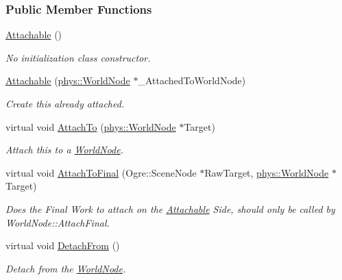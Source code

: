 \subsubsection*{Public Member Functions}
\begin{DoxyCompactItemize}
\item 
\hyperlink{classphys_1_1Attachable_a93c18f22769a1f70ae300fc2c58210eb}{Attachable} ()
\begin{DoxyCompactList}\small\item\em No initialization class constructor. \item\end{DoxyCompactList}\item 
\hyperlink{classphys_1_1Attachable_adec6826c5d9fada8b86d587d7d85a1ef}{Attachable} (\hyperlink{classphys_1_1WorldNode}{phys::WorldNode} $\ast$\_\-AttachedToWorldNode)
\begin{DoxyCompactList}\small\item\em Create this already attached. \item\end{DoxyCompactList}\item 
virtual void \hyperlink{classphys_1_1Attachable_aeec2532772cddde03d3894d99e637367}{AttachTo} (\hyperlink{classphys_1_1WorldNode}{phys::WorldNode} $\ast$Target)
\begin{DoxyCompactList}\small\item\em Attach this to a \hyperlink{classphys_1_1WorldNode}{WorldNode}. \item\end{DoxyCompactList}\item 
virtual void \hyperlink{classphys_1_1Attachable_a77c8234874f53b159f4156c0c984fad0}{AttachToFinal} (Ogre::SceneNode $\ast$RawTarget, \hyperlink{classphys_1_1WorldNode}{phys::WorldNode} $\ast$Target)
\begin{DoxyCompactList}\small\item\em Does the Final Work to attach on the \hyperlink{classphys_1_1Attachable}{Attachable} Side, should only be called by WorldNode::AttachFinal. \item\end{DoxyCompactList}\item 
virtual void \hyperlink{classphys_1_1Attachable_ab9687346893dd8170726410828d684dd}{DetachFrom} ()
\begin{DoxyCompactList}\small\item\em Detach from the \hyperlink{classphys_1_1WorldNode}{WorldNode}. \item\end{DoxyCompactList}\item 

\end{DoxyCompactItemize}
